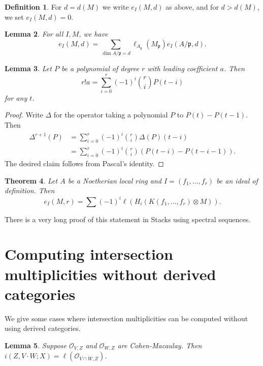 \documentclass[leqno, openany]{memoir}
\newtheorem{thm}{Theorem}[section]
\newtheorem{lem}[thm]{Lemma}
\theoremstyle{definition}
\newtheorem{defn}[thm]{Definition}
\theoremstyle{remark}
\theoremstyle{plain}
\theoremstyle{definition}
\theoremstyle{remark}
\newcommand{\mc}[1]{\mathcal{#1}}
\newcommand{\mf}[1]{\mathfrak{#1}}
\begin{document}
\begin{defn}
    For $d = d(M)$ we write $e_I(M, d)$ as above, and for $d > d(M)$, we set $e_I(M,d) = 0$.
\end{defn}

\begin{lem}
    For all $I, M$, we have
    \[ e_I(M, d) = \sum_{\dim A/\mf{p} = d} \ell_{A_{\mf{p}}} (M_{\mf{p}}) e_{I}(A/\mf{p}, d). \]
\end{lem}

\begin{lem}
    Let $P$ be a polynomial of degree $r$ with leading coefficient $a$. Then
    \[ r! a = \sum_{i=0}^r {(-1)}^i \binom{r}{i} P(t-i) \]
    for any $t$.
\end{lem}

\begin{proof}
    Write $\Delta$ for the operator taking a polynomial $P$ to $P(t) - P(t-1)$. Then
    \begin{align*}
        \Delta^{r+1}(P) &= \sum_{i=0}^r {(-1)}^i \binom{r}{i} \Delta(P)(t-i) \\
                        &= \sum_{i=0}^r {(-1)}^i \binom{r}{i} (P(t-i) - P(t-i-1)).
    \end{align*}
    The desired claim follows from Pascal's identity.
\end{proof}

\begin{thm}
    Let $A$ be a Noetherian local ring and $I = (f_1, \ldots, f_r)$ be an ideal of definition. Then
    \[ e_I(M, r) = \sum {(-1)}^i \ell(H_i(K(f_1, \ldots, f_r) \otimes M)). \]
\end{thm}

There is a very long proof of this statement in Stacks using spectral sequences.

\section{Computing intersection multiplicities without derived categories}%
\label{sec:computing_intersection_multiplicities_without_derived_categories}

We give some cases where intersection multiplicities can be computed without using derived categories.

\begin{lem}
    Suppose $\mc{O}_{V,Z}$ and $\mc{O}_{W,Z}$ are Cohen-Macaulay. Then $i(Z, V \cdot W; X) = \ell(\mc{O}_{V \cap W, Z})$.
\end{lem}
\end{document}
